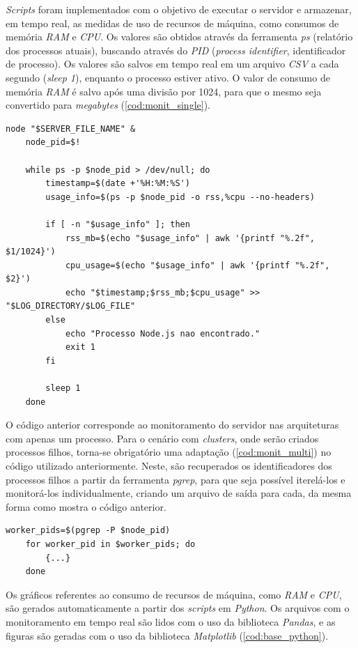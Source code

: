 \documentclass[12pt]{article}
\begin{document}
\textit{Scripts} foram implementados com o objetivo de executar o servidor e armazenar, em tempo real,
as medidas de uso de recursos de máquina, como consumos de memória \textit{RAM} e \textit{CPU}. Os valores 
são obtidos através da ferramenta \textit{ps} (relatório dos processos atuais), buscando através do 
\textit{PID} (\textit{process identifier}, identificador de processo). Os valores são salvos em tempo real em um arquivo 
\textit{CSV} a cada segundo (\textit{sleep 1}), enquanto o processo estiver ativo. 
O valor de consumo de memória \textit{RAM} é salvo após uma divisão por 1024, para que o mesmo 
seja convertido para \textit{megabytes} (\autoref{cod:monit_single}). 

\begin{lstlisting}[caption={\textit{Script} para monitrar processos \textit{single thread}}, label=cod:monit_single]
	node "$SERVER_FILE_NAME" &
	node_pid=$!

	while ps -p $node_pid > /dev/null; do
		timestamp=$(date +'%H:%M:%S')
		usage_info=$(ps -p $node_pid -o rss,%cpu --no-headers)

		if [ -n "$usage_info" ]; then
			rss_mb=$(echo "$usage_info" | awk '{printf "%.2f", $1/1024}')
			cpu_usage=$(echo "$usage_info" | awk '{printf "%.2f", $2}')
			echo "$timestamp;$rss_mb;$cpu_usage" >> "$LOG_DIRECTORY/$LOG_FILE"
		else
			echo "Processo Node.js nao encontrado."
			exit 1
		fi

		sleep 1
	done
\end{lstlisting}

O código anterior corresponde ao monitoramento do servidor nas arquiteturas com apenas um processo. Para o cenário
com \textit{clusters}, onde serão criados processos filhos, torna-se obrigatório uma adaptação (\autoref{cod:monit_multi}) no código utilizado anteriormente. 
Neste, são recuperados os identificadores dos processos filhos 
a partir da ferramenta \textit{pgrep}, para que seja possível iterelá-los e monitorá-los individualmente, 
criando um arquivo de saída para cada, da mesma forma como mostra o código anterior.

\begin{lstlisting}[caption={\textit{Script} para monitrar processos \textit{multi thread}}, label=cod:monit_multi]
	worker_pids=$(pgrep -P $node_pid)
	for worker_pid in $worker_pids; do
		{...}
	done
\end{lstlisting}

Os gráficos referentes ao consumo de recursos de máquina, como \textit{RAM} e \textit{CPU}, são
gerados automaticamente a partir dos \textit{scripts} em \textit{Python}.
Os arquivos com o monitoramento em tempo real são lidos com o uso da biblioteca \textit{Pandas}, e
as figuras são geradas com o uso da biblioteca \textit{Matplotlib} (\autoref{cod:base_python}).
\end{document}
